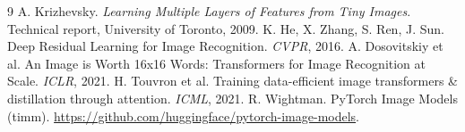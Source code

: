 \documentclass[12pt]{article}
\begin{document}
\begin{thebibliography}{9}
 A. Krizhevsky. \emph{Learning Multiple Layers of Features from Tiny Images}. Technical report, University of Toronto, 2009.
 K. He, X. Zhang, S. Ren, J. Sun. Deep Residual Learning for Image Recognition. \emph{CVPR}, 2016.
 A. Dosovitskiy et al. An Image is Worth 16x16 Words: Transformers for Image Recognition at Scale. \emph{ICLR}, 2021.
 H. Touvron et al. Training data-efficient image transformers \& distillation through attention. \emph{ICML}, 2021.
 R. Wightman. PyTorch Image Models (timm). \url{https://github.com/huggingface/pytorch-image-models}.
\end{thebibliography}
\end{document}

